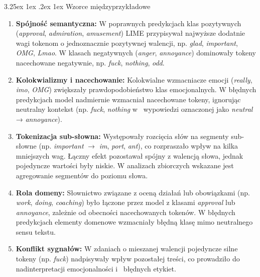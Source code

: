 \documentclass[wmii, inf, mgr]{uwmthesis}
\makeatletter
\renewcommand\paragraph{\@startsection{paragraph}{4}{\z@}%
  {3.25ex \@plus1ex \@minus.2ex}%
  {1ex}%
  {\normalfont\normalsize\bfseries}}
\makeatother
\begin{document}
\paragraph{Wzorce międzyprzykładowe}
\begin{enumerate}
	\item \textbf{Spójność semantyczna:} W poprawnych predykcjach klas pozytywnych (\textit{approval}, \textit{admiration}, \textit{amusement}) LIME przypisywał najwyższe dodatnie wagi tokenom o jednoznacznie pozytywnej walencji, np. \textit{glad}, \textit{important}, \textit{OMG}, \textit{Lmao}. W klasach negatywnych (\textit{anger}, \textit{annoyance}) dominowały tokeny nacechowane negatywnie, np. \textit{fuck}, \textit{nothing}, \textit{odd}.
	\item \textbf{Kolokwializmy i nacechowanie:} Kolokwialne wzmacniacze emocji (\textit{really}, \textit{imo}, \textit{OMG}) zwiększały prawdopodobieństwo klas emocjonalnych. W błędnych predykcjach model nadmiernie wzmacniał nacechowane tokeny, ignorując neutralny kontekst (np. \textit{fuck}, \textit{nothing} w~ wypowiedzi oznaczonej jako \textit{neutral} → \textit{annoyance}).
	\item \textbf{Tokenizacja sub-słowna:} Występowały rozcięcia słów na segmenty sub-słowne (np. \textit{important} $\rightarrow$ \textit{im}, \textit{port}, \textit{ant}), co rozpraszało wpływ na kilka mniejszych wag. Łączny efekt pozostawał spójny z walencją słowa, jednak pojedyncze wartości były niskie. W analizach zbiorczych wskazane jest agregowanie segmentów do poziomu słowa.
	\item \textbf{Rola domeny:} Słownictwo związane z oceną działań lub obowiązkami (np. \textit{work}, \textit{doing}, \textit{coaching}) było łączone przez model z klasami \textit{approval} lub \textit{annoyance}, zależnie od obecności nacechowanych tokenów. W błędnych predykcjach elementy domenowe wzmacniały błędną klasę mimo neutralnego sensu tekstu.
	\item \textbf{Konflikt sygnałów:} W zdaniach o mieszanej walencji pojedyncze silne tokeny (np. \textit{fuck}) nadpisywały wpływ pozostałej treści, co prowadziło do nadinterpretacji emocjonalności i~ błędnych etykiet.
\end{enumerate}
\end{document}
